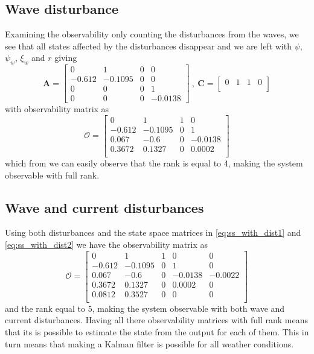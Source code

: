 \subsection{Wave disturbance}
Examining the observability only counting the disturbances from the waves, we see that all states affected by the disturbances disappear and we are left with $\psi$, $\psi_w$, $\xi_w$ and $r$ giving 
\begin{equation}
    \boldsymbol{A} = \begin{bmatrix}
        0 & 1 & 0 & 0 \\
        -0.612 & -0.1095 & 0 & 0 \\
        0 & 0 & 0 & 1 \\
        0 & 0 & 0 & -0.0138
    \end{bmatrix} \ , \ \boldsymbol{C} = \begin{bmatrix} 
        0 & 1 & 1 & 0 \\
    \end{bmatrix}
\end{equation}
with observability matrix as 
\begin{equation}
  \boldsymbol{\mathcal{O}} =
  \begin{bmatrix}
    0 & 1 & 1 & 0 \\
    -0.612 & -0.1095 & 0 & 1 \\
    0.067 & -0.6 & 0 & -0.0138 \\
    0.3672 & 0.1327 & 0 & 0.0002 \\
  \end{bmatrix}
\end{equation}
which from we can easily observe that the rank is equal to 4, making the system observable with full rank. 


\subsection{Wave and current disturbances}\label{sec:part4.5}
Using both disturbances and the state space matrices in \cref{eq:ss_with_dist1} and \cref{eq:ss_with_dist2} we have the observability matrix as 
\begin{equation}
  \boldsymbol{\mathcal{O}} =
  \begin{bmatrix}
    0 & 1 & 1 & 0 & 0 \\
    -0.612 & -0.1095 & 0 & 1 & 0 \\
    0.067 & -0.6 & 0 & -0.0138 & -0.0022 \\
    0.3672 & 0.1327 & 0 & 0.0002 & 0 \\
    0.0812 & 0.3527 & 0 & 0 & 0 \\
  \end{bmatrix}
\end{equation}
and the rank equal to 5, making the system observable with both wave and current disturbances. Having all there observability matrices with full rank means that its is possible to estimate the state from the output for each of them. This in turn means that making a Kalman filter is possible for all weather conditions. 
